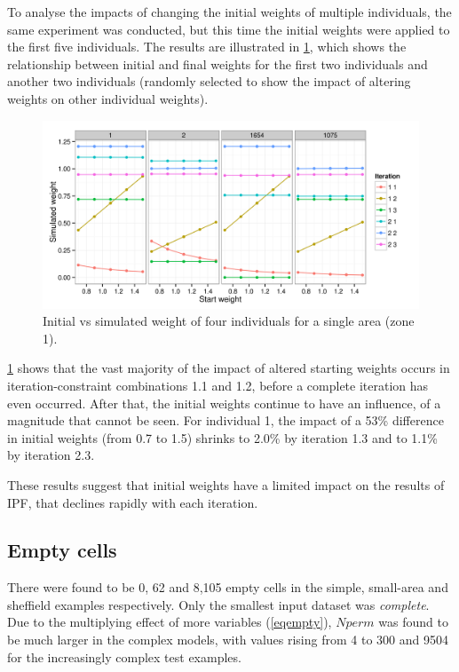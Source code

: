 \documentclass[a4paper,10pt]{article}
\begin{document}
To analyse the impacts of changing the initial weights of multiple 
individuals, the same experiment was conducted, but this time the initial weights were
applied to the first five individuals. The results are illustrated in \cref{finweight},
which shows the relationship between initial and final weights for the first two individuals
and another two individuals 
(randomly selected to show the impact of altering weights on other individual weights). 

\begin{figure}
 \begin{center}
  \includegraphics[width=12cm]{weights-exp-54nice2}
 \end{center}
\caption{Initial vs simulated weight of four individuals for a single area (zone 1).}
\label{finweight}
\end{figure}

\cref{finweight} shows that the vast majority of the impact of altered starting weights occurs in iteration-constraint
combinations 1.1 and 1.2, before a complete iteration has even occurred. 
After that, the initial weights continue to have an influence, of a magnitude that cannot be 
seen. For individual 1, the impact of a 53\% difference in initial weights (from 0.7 to 1.5) shrinks to 
2.0\% by iteration 1.3 and to 1.1\% by iteration 2.3. 

These results suggest that initial weights have a limited impact on the results of IPF, that declines rapidly with each iteration. 

\subsection{Empty cells}

There were found to be 0, 62 and 8,105 empty cells in the simple, small-area and sheffield
examples respectively. Only the smallest input dataset was
\emph{complete}. Due to the multiplying effect of more variables (\cref{eqempty}),
$Nperm$ was found to be much larger in the complex models, with values rising from
4 to 300 and 9504 for the increasingly complex test examples. 
\end{document}
